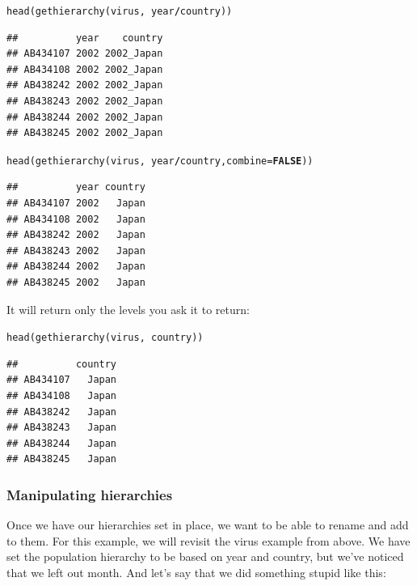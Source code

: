 \documentclass[letterpaper]{article}\usepackage[]{graphicx}\usepackage[]{color}
\makeatletter
\newcommand{\hlnum}[1]{\textcolor[rgb]{0.502,0,0.502}{\textbf{#1}}}%
\newcommand{\hlopt}[1]{\textcolor[rgb]{1,0,0.502}{\textbf{#1}}}%
\newcommand{\hlstd}[1]{\textcolor[rgb]{0,0,0}{#1}}%
\newcommand{\hlkwc}[1]{\textcolor[rgb]{0,0.502,0.753}{#1}}%
\newcommand{\hlkwd}[1]{\textcolor[rgb]{0,0.267,0.4}{#1}}%
\newenvironment{kframe}{%
 \def\at@end@of@kframe{}%
 \ifinner\ifhmode%
  \def\at@end@of@kframe{\end{minipage}}%
  \begin{minipage}{\columnwidth}%
 \fi\fi%
 \def\FrameCommand##1{\hskip\@totalleftmargin \hskip-\fboxsep
 \colorbox{shadecolor}{##1}\hskip-\fboxsep
     \hskip-\linewidth \hskip-\@totalleftmargin \hskip\columnwidth}%
 \MakeFramed {\advance\hsize-\width
   \@totalleftmargin\z@ \linewidth\hsize
   \@setminipage}}%
 {\par\unskip\endMakeFramed%
 \at@end@of@kframe}
\newenvironment{knitrout}{}{} %
\makeatother
\begin{document}
\begin{knitrout}\footnotesize
{}\color{fgcolor}\begin{kframe}
\begin{alltt}
\hlkwd{head}\hlstd{(}\hlkwd{gethierarchy}\hlstd{(virus,} \hlopt{~}\hlstd{year}\hlopt{/}\hlstd{country))}
\end{alltt}
\begin{verbatim}
##          year    country
## AB434107 2002 2002_Japan
## AB434108 2002 2002_Japan
## AB438242 2002 2002_Japan
## AB438243 2002 2002_Japan
## AB438244 2002 2002_Japan
## AB438245 2002 2002_Japan
\end{verbatim}
\begin{alltt}
\hlkwd{head}\hlstd{(}\hlkwd{gethierarchy}\hlstd{(virus,} \hlopt{~}\hlstd{year}\hlopt{/}\hlstd{country,} \hlkwc{combine} \hlstd{=} \hlnum{FALSE}\hlstd{))}
\end{alltt}
\begin{verbatim}
##          year country
## AB434107 2002   Japan
## AB434108 2002   Japan
## AB438242 2002   Japan
## AB438243 2002   Japan
## AB438244 2002   Japan
## AB438245 2002   Japan
\end{verbatim}
\end{kframe}
\end{knitrout}


It will return only the levels you ask it to return:

\begin{knitrout}\footnotesize
{}\color{fgcolor}\begin{kframe}
\begin{alltt}
\hlkwd{head}\hlstd{(}\hlkwd{gethierarchy}\hlstd{(virus,} \hlopt{~}\hlstd{country))}
\end{alltt}
\begin{verbatim}
##          country
## AB434107   Japan
## AB434108   Japan
## AB438242   Japan
## AB438243   Japan
## AB438244   Japan
## AB438245   Japan
\end{verbatim}
\end{kframe}
\end{knitrout}


\subsubsection{Manipulating hierarchies}
\label{data.manip:hier:manip}

Once we have our hierarchies set in place, we want to be able to rename and add
to them. For this example, we will revisit the virus example from above. We have
set the population hierarchy to be based on year and country, but we've noticed
that we left out month. And let's say that we did something stupid like this:
\end{document}

